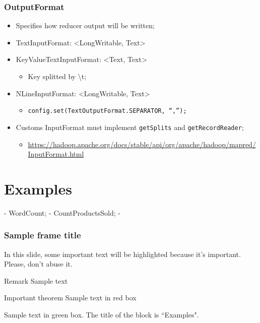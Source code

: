\documentclass[aspectratio=169]{beamer}
\begin{document}
\begin{frame}
	\frametitle{OutputFormat}

	\begin{itemize}
		\item Specifies how reducer output will be written;
		\item TextInputFormat: <LongWritable, Text>
		\item KeyValueTextInputFormat: <Text, Text>
		      \begin{itemize}
			      \item Key splitted by \textbackslash t;
		      \end{itemize}
		\item NLineInputFormat: <LongWritable, Text>
		      \begin{itemize}
			      \item {\scriptsize \texttt{config.set(TextOutputFormat.SEPARATOR, ``,'');}}
		      \end{itemize}
		\item Customs InputFormat must implement \texttt{getSplits} and \texttt{getRecordReader};
		      \begin{itemize}
			      \item {\tiny \href{https://hadoop.apache.org/docs/stable/api/org/apache/hadoop/mapred/InputFormat.html}{https://hadoop.apache.org/docs/stable/api/org/apache/hadoop/mapred/InputFormat.html}}
		      \end{itemize}
	\end{itemize}
\end{frame}

\section{Examples}

- WordCount;
- CountProductsSold;
-

\begin{frame}
	\frametitle{Sample frame title}

	In this slide, some important text will be
	\alert{highlighted} because it's important.
	Please, don't abuse it.

	\begin{block}{Remark}
		Sample text
	\end{block}

	\begin{alertblock}{Important theorem}
		Sample text in red box
	\end{alertblock}

	\begin{examples}
		Sample text in green box. The title of the block is ``Examples".
	\end{examples}
\end{frame}
\end{document}
